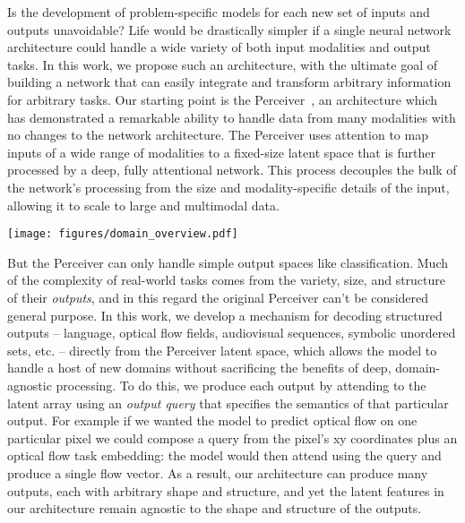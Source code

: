 \documentclass{article} \usepackage{iclr2022_conference,times}
\newcommand{\ourmodel}{Perceiver IO\xspace}
\begin{document}
Is the development of problem-specific models for each new set of inputs and outputs unavoidable? Life would be drastically simpler if a single neural network architecture could handle a wide variety of both input modalities and output tasks. In this work, we propose such an architecture, with the ultimate goal of building a network that can easily integrate and transform arbitrary information for arbitrary tasks. Our starting point is the Perceiver~\citep{jaegle2021perceiver}, an architecture which has demonstrated a remarkable ability to handle data from many modalities with no changes to the network architecture. The Perceiver uses attention to map inputs of a wide range of modalities to a fixed-size latent space that is further processed by a deep, fully attentional network. This process decouples the bulk of the network's processing from the size and modality-specific details of the input, allowing it to scale to large and multimodal data.

\begin{figure*}[t]
    \centering
    \texttt{[image: figures/domain\_overview.pdf]}
    \caption{The \ourmodel{} architecture can be used on domains with a wide variety of input and output spaces, including multi-task language understanding, dense visual tasks like optical flow, hybrid dense/sparse multimodal tasks such as video+audio+class autoencoding, and tasks with symbolic outputs like StarCraft . See Tables~\ref{tab:input_output_details} and~\ref{tab:pos_encodings_queries} for details of all domains considered here.}
    \label{fig:domain_overview}
    \vspace{-12pt}
\end{figure*}

But the Perceiver can only handle simple output spaces like classification. Much of the complexity of real-world tasks comes from the variety, size, and structure of their \textit{outputs}, and in this regard the original Perceiver can't be considered general purpose. In this work, we develop a mechanism for decoding structured outputs -- language, optical flow fields, audiovisual sequences, symbolic unordered sets, etc. -- directly from the Perceiver latent space, which allows the model to handle a host of new domains without sacrificing the benefits of deep, domain-agnostic processing. To do this, we produce each output by attending to the latent array using an \textit{output query} that specifies the semantics of that particular output. For example if we wanted the model to predict optical flow on one particular pixel we could compose a query from the pixel's xy coordinates plus an optical flow task embedding: the model would then attend using the query and produce a single flow vector. As a result, our architecture can produce many outputs, each with arbitrary shape and structure, and yet the latent features in our architecture remain agnostic to the shape and structure of the outputs.
 
\end{document}
